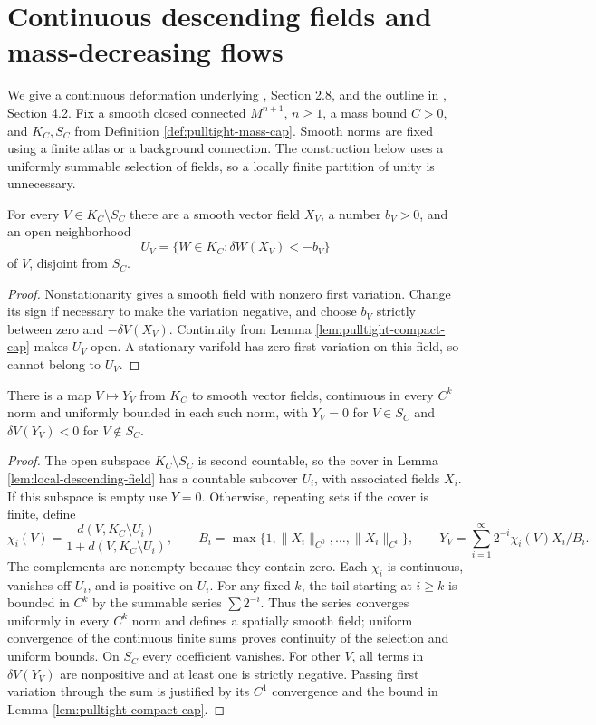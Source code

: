 \chapter{Continuous descending fields and mass-decreasing flows}\label{sec:pulltight-deformation}
We give a continuous deformation underlying \cite{MNIndex}, Section 2.8, and the outline in \cite{LiAP}, Section 4.2. Fix a smooth closed connected $M^{n+1}$, $n\geq1$, a mass bound $C>0$, and $K_C,S_C$ from Definition \ref{def:pulltight-mass-cap}. Smooth norms are fixed using a finite atlas or a background connection. The construction below uses a uniformly summable selection of fields, so a locally finite partition of unity is unnecessary.

\begin{lemma}\label{lem:local-descending-field}
For every $V\in K_C\setminus S_C$ there are a smooth vector field $X_V$, a number $b_V>0$, and an open neighborhood
\[
 U_V=\{W\in K_C:\delta W(X_V)<-b_V\}
\]
of $V$, disjoint from $S_C$.
\end{lemma}
\begin{proof}
Nonstationarity gives a smooth field with nonzero first variation. Change its sign if necessary to make the variation negative, and choose $b_V$ strictly between zero and $-\delta V(X_V)$. Continuity from Lemma \ref{lem:pulltight-compact-cap} makes $U_V$ open. A stationary varifold has zero first variation on this field, so cannot belong to $U_V$.
\end{proof}

\begin{lemma}\label{lem:global-descending-field}
There is a map $V\mapsto Y_V$ from $K_C$ to smooth vector fields, continuous in every $C^k$ norm and uniformly bounded in each such norm, with $Y_V=0$ for $V\in S_C$ and $\delta V(Y_V)<0$ for $V\notin S_C$.
\end{lemma}
\begin{proof}
The open subspace $K_C\setminus S_C$ is second countable, so the cover in Lemma \ref{lem:local-descending-field} has a countable subcover $U_i$, with associated fields $X_i$. If this subspace is empty use $Y=0$. Otherwise, repeating sets if the cover is finite, define
\[
 \chi_i(V)=\frac{d(V,K_C\setminus U_i)}{1+d(V,K_C\setminus U_i)},\qquad
 B_i=\max\{1,\|X_i\|_{C^0},\ldots,\|X_i\|_{C^i}\},\qquad
 Y_V=\sum_{i=1}^\infty 2^{-i}\chi_i(V)X_i/B_i.
\]
The complements are nonempty because they contain zero. Each $\chi_i$ is continuous, vanishes off $U_i$, and is positive on $U_i$. For any fixed $k$, the tail starting at $i\geq k$ is bounded in $C^k$ by the summable series $\sum 2^{-i}$. Thus the series converges uniformly in every $C^k$ norm and defines a spatially smooth field; uniform convergence of the continuous finite sums proves continuity of the selection and uniform bounds. On $S_C$ every coefficient vanishes. For other $V$, all terms in $\delta V(Y_V)$ are nonpositive and at least one is strictly negative. Passing first variation through the sum is justified by its $C^1$ convergence and the bound in Lemma \ref{lem:pulltight-compact-cap}.
\end{proof}

